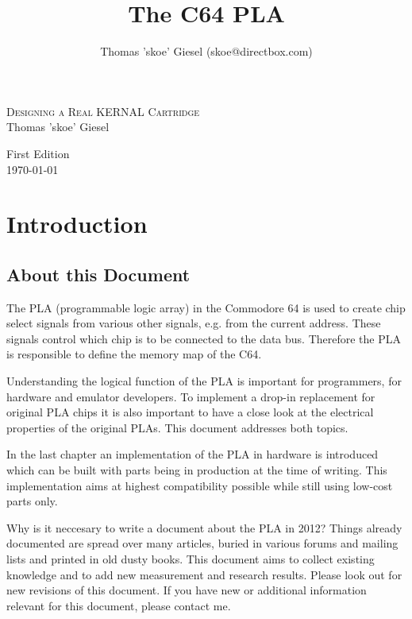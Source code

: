 \documentclass[a4paper,oneside]{memoir}
\title{The C64 PLA}
\author{
Thomas 'skoe' Giesel
(skoe@directbox.com)
}
\begin{document}
\hsize

\pagestyle{empty}
\begin{center}

\vspace*{5cm}
\textsc{\huge Designing a Real KERNAL Cartridge}\\[2cm]
{\large Thomas 'skoe' Giesel}

\vfill

{\large First Edition \\[0.5cm] \today}

\end{center}

\clearpage
\tableofcontents

\chapter{Introduction}

\section{About this Document}

The PLA (programmable logic array) in the Commodore 64 is used to create
chip select signals from various other signals, e.g. from the current
address. These signals control which chip is to be connected to the data
bus. Therefore the PLA is responsible to define the memory map of the C64.

Understanding the logical function of the PLA is important for programmers,
for hardware and emulator developers. To implement a drop-in replacement for
original PLA chips it is also important to have a close look at the
electrical properties of the original PLAs. This document addresses both
topics.

In the last chapter an implementation of the PLA in hardware is introduced
which can be built with parts being in production at the time of
writing. This implementation aims at highest compatibility possible while
still using low-cost parts only.

Why is it neccesary to write a document about the PLA in 2012? Things
already documented are spread over many articles, buried in various forums
and mailing lists and printed in old dusty books. This document aims to
collect existing knowledge and to add new measurement and research results.
Please look out for new revisions of this document. If you have new or
additional information relevant for this document, please contact me.
\end{document}
